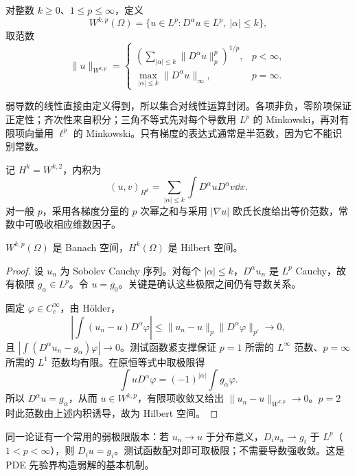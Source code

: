 \begin{definition}\label{def:sobolev}
对整数 $k\ge0$、$1\le p\le\infty$，定义
\begin{equation}
 W^{k,p}(\Omega)=\{u\in L^p:D^\alpha u\in L^p,\ |\alpha|\le k\},
 \label{eq:sobolev-definition}
\end{equation}
取范数
\begin{equation}
 \|u\|_{W^{k,p}}=
 \begin{cases}(\sum_{|\alpha|\le k}\|D^\alpha u\|_p^p)^{1/p},&p<\infty,\\
 \max_{|\alpha|\le k}\|D^\alpha u\|_\infty,&p=\infty.
 \end{cases}
 \label{eq:sobolev-norm}
\end{equation}
\end{definition}
弱导数的线性直接由定义得到，所以集合对线性运算封闭。各项非负，零阶项保证正定性；齐次性来自积分；三角不等式先对每个导数用 $L^p$ 的 Minkowski，再对有限项向量用 $\ell^p$ 的 Minkowski。只有梯度的表达式通常是半范数，因为它不能识别常数。

记 $H^k=W^{k,2}$，内积为
\begin{equation}
 (u,v)_{H^k}=\sum_{|\alpha|\le k}\int D^\alpha uD^\alpha v\dd x.
 \label{eq:sobolev-inner-product}
\end{equation}
对一般 $p$，采用各梯度分量的 $p$ 次幂之和与采用 $|\nabla u|$ 欧氏长度给出等价范数，常数中可吸收相应维数因子。

\begin{theorem}\label{thm:sobolev-complete}
$W^{k,p}(\Omega)$ 是 Banach 空间，$H^k(\Omega)$ 是 Hilbert 空间。
\end{theorem}
\begin{proof}
设 $u_n$ 为 Sobolev Cauchy 序列。对每个 $|\alpha|\le k$，$D^\alpha u_n$ 是 $L^p$ Cauchy，故有极限 $g_\alpha\in L^p$。令 $u=g_0$。关键是确认这些极限之间仍有导数关系。

固定 $\varphi\in C_c^\infty$，由 H\"older，
\[
 \left|\int(u_n-u)D^\alpha\varphi\right|
 \le\|u_n-u\|_p\|D^\alpha\varphi\|_{p'}\to0,
\]
且 $|\int(D^\alpha u_n-g_\alpha)\varphi|\to0$。测试函数紧支撑保证 $p=1$ 所需的 $L^\infty$ 范数、$p=\infty$ 所需的 $L^1$ 范数均有限。在原恒等式中取极限得
\[
 \int uD^\alpha\varphi=(-1)^{|\alpha|}\int g_\alpha\varphi.
\]
所以 $D^\alpha u=g_\alpha$，从而 $u\in W^{k,p}$，有限项收敛又给出 $\|u_n-u\|_{W^{k,p}}\to0$。$p=2$ 时此范数由上述内积诱导，故为 Hilbert 空间。
\end{proof}

同一论证有一个常用的弱极限版本：若 $u_n\to u$ 于分布意义，$D_iu_n\rightharpoonup g_i$ 于 $L^p$（$1<p<\infty$），则 $D_iu=g_i$。测试函数配对即可取极限；不需要导数强收敛。这是 PDE 先验界构造弱解的基本机制。

